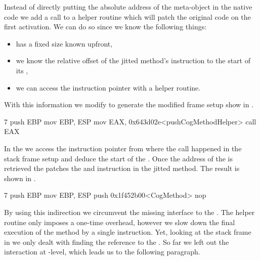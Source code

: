 Instead of directly putting the absolute address of the meta-object in the native code we add a call to a helper routine which will patch the original code on the first activation.
We can do so since we know the following things:
\begin{itemize}[noitemsep,nolistsep]
	\item \CogMethod has a fixed size known upfront,
	\item we know the relative offset of the jitted method's instruction to the start of its \CogMethod,
	\item we can access the instruction pointer with a helper routine.
\end{itemize}
%
\noindent With this information we modify \NBJ to generate the modified frame setup show in .
%
\begin{numstcode}[
	caption={\NBJ Stack Frame Setup},
	label={lst:val-nabujito-frame-setup}]{7}
push EBP
mov  EBP, ESP
mov  EAX, 0x643d02e<pushCogMethodHelper>
call EAX
\end{numstcode}
%
In the  we access the instruction pointer from where the call happened in the stack frame setup and deduce the start of the \CogMethod.
Once the address of the \CogMethod is retrieved the  patches the  and  instruction in the jitted method.
The result is shown in .
%
\begin{numstcode}[
	caption={\NBJ Patched Stack Frame Setup},
	label={lst:val-nabujito-patched-frame-setup}]{7}
push EBP
mov  EBP, ESP
push 0x1f452b00<CogMethod>
nop
\end{numstcode}
%
By using this indirection we circumvent the missing interface to the \JIT.
The helper routine only imposes a one-time overhead, however we slow down the final execution of the \NBJ method by a single  instruction.
Yet, looking at the \Cog stack frame in  we only dealt with finding the reference to the \CogMethod.
So far we left out the \GC interaction at \JIT-level, which leads us to the following paragraph.

